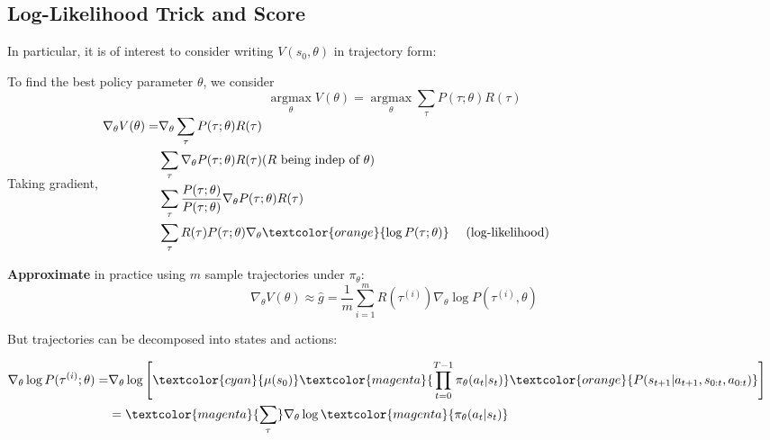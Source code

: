 \documentclass{article}
\begin{document}
\subsection{Log-Likelihood Trick and Score}
In particular, it is of interest to consider writing $V(s_0, \theta)$ in trajectory form:
\begin{prfbox}
    To find the best policy parameter $\theta$, we consider
    \begin{equation*}
        \mathop{\arg\max}\limits_{\theta} V(\theta)
        =
        \mathop{\arg\max}\limits_{\theta} \sum_{\tau} P(\tau ; \theta) R(\tau)
    \end{equation*}
    Taking gradient,
    $\begin{aligned}
        \nabla_{\theta} V(\theta) =
        & \nabla_{\theta} \sum_{\tau} P(\tau; \theta) R(\tau) \\
        & \sum_{\tau} \nabla_{\theta} P(\tau; \theta) R(\tau) \text{($R$ being indep of $\theta$)}\\
        & \sum_{\tau} \frac{P(\tau; \theta)}{P(\tau; \theta)} \nabla_{\theta} P(\tau; \theta) R(\tau) \\
        & \sum_{\tau} R(\tau) P(\tau; \theta) \nabla_{\theta} \textcolor{orange}{\log P(\tau; \theta)} ~~~~\text{(log-likelihood)} \\
    \end{aligned}$

    \textbf{Approximate} in practice using $m$ sample trajectories under $\pi_{\theta}$:
    \begin{equation*}
        \nabla_{\theta} V(\theta) \approx \hat{g} = \frac{1}{m} \sum_{i = 1}^{m} R(\tau^{(i)}) \nabla_{\theta} \log P(\tau^{(i)}, \theta)
    \end{equation*}
\end{prfbox}

But trajectories can be decomposed into states and actions:
\begin{prfbox}
    $\begin{aligned}
        \nabla_{\theta} \log P(\tau^{(i)}; \theta) =
        & \nabla_{\theta} \log \left[ \textcolor{cyan}{\mu(s_0)} 
            \textcolor{magenta}{\prod_{t = 0}^{T-1} \pi_{\theta} (a_t | s_t)}
            \textcolor{orange}{P(s_{t+1} | a_{t+1}, s_{0:t}, a_{0:t})} \right] \\
        & =\textcolor{magenta}{\sum_{\tau}} \nabla_{\theta} \log \textcolor{magenta}{\pi_{\theta} (a_t | s_t)} \\
    \end{aligned}$
\end{prfbox}
\end{document}
